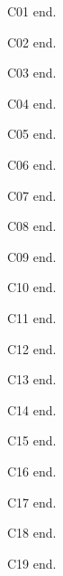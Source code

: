 C01 \textcite{s1} \parencite{s1} end.

C02 \textcite{s2} \parencite{s2} end.

C03 \textcite{s3} \parencite{s3} end.

C04 \textcite{s4} \citeauthor{s4} end.

C05 \textcite{s5,s6} \parencite{s5,s6} end.

C06 \textcite{s7} \parencite{s7} end.

C07 \textcite{h1} \textcite{h2} end.

C08 \textcite{p1} \textcite{p2} end.

C09 \textcite{j1} \textcite{j2} end.

C10 \textcite{u1} \textcite{u2} \textcite{u3} end.

C11 \textcite{e1} \textcite{e2} end.

C12 \textcite{c1} \textcite{c2} end.

C13 \textcite{f1} \textcite{f2} end.

C14 \textcite{o1} \textcite{o2} end.

C15 \textcite{t1} \textcite{t2} end.

C16 \textcite{sa1} \parencite{sa1} end.

C17 \textcite{se1} \parencite{se1} end.

C18 \textcite{sh1} \parencite{sh1} \cite{sh1} end.

C19 \textcite{n1} \parencite{n2} end.
